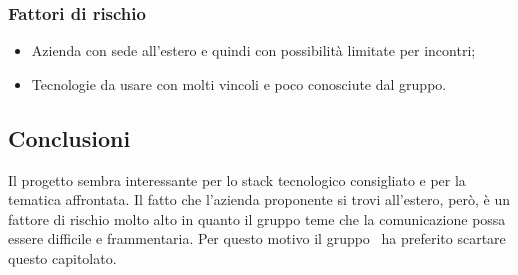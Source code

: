 \documentclass[../StudioDiFattibilita.tex]{subfiles}
\begin{document}
			\subsubsection{Fattori di rischio}
				\begin{itemize}
				\item Azienda con sede all'estero e quindi con possibilità limitate per incontri;
				\item Tecnologie da usare con molti vincoli e poco conosciute dal gruppo.
			\end{itemize}
			
			\subsection{Conclusioni}
				Il progetto sembra interessante per lo stack tecnologico consigliato e per la tematica affrontata. Il fatto che l'azienda proponente si trovi all'estero, però, è un fattore di rischio molto alto in quanto il gruppo teme che la comunicazione possa essere difficile e frammentaria. Per questo motivo il gruppo \kaleidoscode\ ha preferito scartare questo capitolato.
\end{document}

